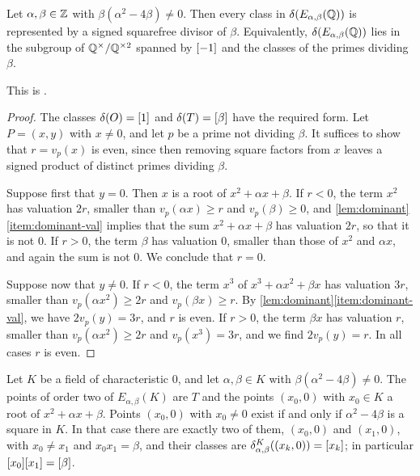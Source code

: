 \begin{lemma}\label{lem:support}
Let $\alpha,\beta\in\mathbb Z$ with $\beta(\alpha^2-4\beta)\ne0$. Then every class in $\delta(E_{\alpha,\beta}(\mathbb Q))$ is represented by a signed squarefree divisor of $\beta$. Equivalently, $\delta(E_{\alpha,\beta}(\mathbb Q))$ lies in the subgroup of $\mathbb Q^{\times}/\mathbb Q^{\times2}$ spanned by $[-1]$ and the classes of the primes dividing $\beta$.
\end{lemma}

This is \cite[Proposition~3.8(c)]{SilvermanTate2015}.

\begin{proof}
The classes $\delta(O)=[1]$ and $\delta(T)=[\beta]$ have the required form. Let $P=(x,y)$ with $x\ne0$, and let $p$ be a prime not dividing $\beta$. It suffices to show that $r=v_p(x)$ is even, since then removing square factors from $x$ leaves a signed product of distinct primes dividing $\beta$.

Suppose first that $y=0$. Then $x$ is a root of $x^2+\alpha x+\beta$. If $r<0$, the term $x^2$ has valuation $2r$, smaller than $v_p(\alpha x)\ge r$ and $v_p(\beta)\ge0$, and \cref{lem:dominant}\ref{item:dominant-val} implies that the sum $x^2+\alpha x+\beta$ has valuation $2r$, so that it is not $0$. If $r>0$, the term $\beta$ has valuation $0$, smaller than those of $x^2$ and $\alpha x$, and again the sum is not $0$. We conclude that $r=0$.

Suppose now that $y\ne0$. If $r<0$, the term $x^3$ of $x^3+\alpha x^2+\beta x$ has valuation $3r$, smaller than $v_p(\alpha x^2)\ge2r$ and $v_p(\beta x)\ge r$. By \cref{lem:dominant}\ref{item:dominant-val}, we have $2v_p(y)=3r$, and $r$ is even. If $r>0$, the term $\beta x$ has valuation $r$, smaller than $v_p(\alpha x^2)\ge2r$ and $v_p(x^3)=3r$, and we find $2v_p(y)=r$. In all cases $r$ is even.
\end{proof}

\begin{lemma}\label{lem:two-torsion}
Let $K$ be a field of characteristic $0$, and let $\alpha,\beta\in K$ with $\beta(\alpha^2-4\beta)\ne0$. The points of order two of $E_{\alpha,\beta}(K)$ are $T$ and the points $(x_0,0)$ with $x_0\in K$ a root of $x^2+\alpha x+\beta$. Points $(x_0,0)$ with $x_0\ne0$ exist if and only if $\alpha^2-4\beta$ is a square in $K$. In that case there are exactly two of them, $(x_0,0)$ and $(x_1,0)$, with $x_0\ne x_1$ and $x_0x_1=\beta$, and their classes are $\delta^K_{\alpha,\beta}((x_k,0))=[x_k]$; in particular $[x_0][x_1]=[\beta]$.
\end{lemma}

